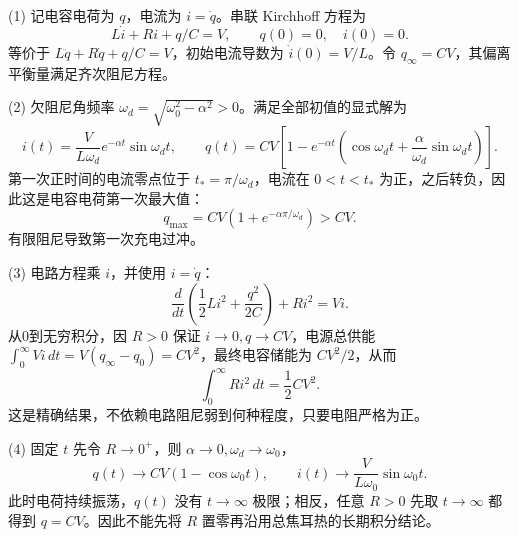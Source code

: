 (1) 记电容电荷为 \(q\)，电流为 \(i=\dot q\)。串联 Kirchhoff 方程为
\[
L\dot i+Ri+q/C=V,\qquad q(0)=0,\quad i(0)=0.
\]
等价于 \(L\ddot q+R\dot q+q/C=V\)，初始电流导数为 \(\dot i(0)=V/L\)。令 \(q_{\infty}=CV\)，其偏离平衡量满足齐次阻尼方程。

(2) 欠阻尼角频率 \(\omega_d=\sqrt{\omega_0^2-\alpha^2}>0\)。满足全部初值的显式解为
\[
i(t)=\frac{V}{L\omega_d}e^{-\alpha t}\sin\omega_dt,\qquad
q(t)=CV\left[1-e^{-\alpha t}\left(\cos\omega_dt+\frac{\alpha}{\omega_d}\sin\omega_dt\right)\right].
\]
第一次正时间的电流零点位于 \(t_*=\pi/\omega_d\)，电流在 \(0<t<t_*\) 为正，之后转负，因此这是电容电荷第一次最大值：
\[
q_{\max}=CV\left(1+e^{-\alpha\pi/\omega_d}\right)>CV.
\]
有限阻尼导致第一次充电过冲。

(3) 电路方程乘 \(i\)，并使用 \(i=\dot q\)：
\[
\frac d{dt}\left(\frac12Li^2+\frac{q^2}{2C}\right)+Ri^2=Vi.
\]
从0到无穷积分，因 \(R>0\) 保证 \(i\to0,q\to CV\)，电源总供能 \(\int_0^\infty Vi\,dt=V(q_\infty-q_0)=CV^2\)，最终电容储能为 \(CV^2/2\)，从而
\[
\int_0^\infty Ri^2\,dt=\frac12CV^2.
\]
这是精确结果，不依赖电路阻尼弱到何种程度，只要电阻严格为正。

(4) 固定 \(t\) 先令 \(R\to0^+\)，则 \(\alpha\to0,\omega_d\to\omega_0\)，
\[
q(t)\to CV(1-\cos\omega_0t),\qquad i(t)\to \frac V{L\omega_0}\sin\omega_0t.
\]
此时电荷持续振荡，\(q(t)\) 没有 \(t\to\infty\) 极限；相反，任意 \(R>0\) 先取 \(t\to\infty\) 都得到 \(q=CV\)。因此不能先将 \(R\) 置零再沿用总焦耳热的长期积分结论。
